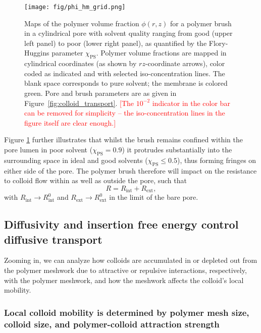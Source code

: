 \documentclass[12pt, a4paper]{article}
\newcommand\todo[1]{\textcolor{red}{#1}}
\begin{document}
\begin{figure}
    \centering
    \texttt{[image: fig/phi\_hm\_grid.png]}
    \caption{
    Maps of the polymer volume fraction $\phi(r,z)$ for a polymer brush in a cylindrical pore with solvent quality ranging from good (upper left panel) to poor (lower right panel), as quantified by the Flory-Huggins parameter $\chi_{\text{PS}}$.
    Polymer volume fractions are mapped in cylindrical coordinates (as shown by $rz$-coordinate arrows), color coded as indicated and with selected iso-concentration lines. The blank space corresponds to pure solvent; the membrane is colored green.
    Pore and brush parameters are as given in Figure~\ref{fig:colloid_transport}.
    \todo{[The $10^{-2}$ indicator in the color bar can be removed for simplicity -- the iso-concentration lines in the figure itself are clear enough.]}
    }
    \label{fig:phi_hm_grid}
\end{figure}

Figure \ref{fig:phi_hm_grid} further illustrates that whilst the brush remains confined within the pore lumen in poor solvent ($\chi_{\text{PS}}=0.9$) it protrudes substantially into the surrounding space in ideal and good solvents ($\chi_{\text{PS}}\le0.5$), thus forming fringes on either side of the pore.
The polymer brush therefore will impact on the resistance to colloid flow within as well as outside the pore, such that
\begin{equation}
    R=R_{\text{int}}+R_{\text{ext}},
    \label{eq:R_tot_tot}
\end{equation}
with $R_{\text{int}}\rightarrow R_{\text{int}}^{0}$ and $R_{\text{ext}}\rightarrow R_{\text{ext}}^{0}$ in the limit of the bare pore.


\subsection{Diffusivity and insertion free energy control diffusive transport}

Zooming in, we can analyze how colloids are accumulated in or depleted out from the polymer meshwork due to attractive or repulsive interactions, respectively, with the polymer meshwork, and how the meshwork affects the colloid's local mobility.

\subsubsection{Local colloid mobility is determined by polymer mesh size, colloid size, and polymer-colloid attraction strength}
\end{document}
